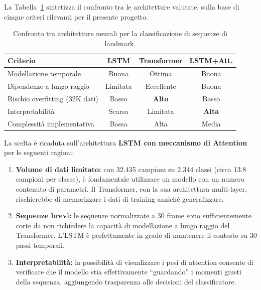 La Tabella~\ref{tab:confronto_architetture} sintetizza il confronto tra le architetture valutate, sulla base di cinque criteri rilevanti per il presente progetto.

\begin{table}[H]
\centering
\begin{tabular}{lccc}
\hline
\textbf{Criterio} & \textbf{LSTM} & \textbf{Transformer} & \textbf{LSTM+Att.} \\
\hline
Modellazione temporale         & Buona    & Ottima     & Buona     \\
Dipendenze a lungo raggio      & Limitata & Eccellente & Buona     \\
Rischio overfitting (32K dati) & Basso    & \textbf{Alto} & Basso     \\
Interpretabilità               & Scarsa   & Limitata   & \textbf{Alta} \\
Complessità implementativa     & Bassa    & Alta       & Media     \\
\hline
\end{tabular}
\caption{Confronto tra architetture neurali per la classificazione di sequenze di landmark.}
\label{tab:confronto_architetture}
\end{table}

La scelta è ricaduta sull'architettura \textbf{LSTM con meccanismo di Attention} per le seguenti ragioni:

\begin{enumerate}
    \item \textbf{Volume di dati limitato:} con 32.435 campioni su 2.344 classi (circa 13.8 campioni per classe), è fondamentale utilizzare un modello con un numero contenuto di parametri. Il Transformer, con la sua architettura multi-layer, rischierebbe di memorizzare i dati di training anziché generalizzare.

    \item \textbf{Sequenze brevi:} le sequenze normalizzate a 30 frame sono sufficientemente corte da non richiedere la capacità di modellazione a lungo raggio del Transformer. L'LSTM è perfettamente in grado di mantenere il contesto su 30 passi temporali.

    \item \textbf{Interpretabilità:} la possibilità di visualizzare i pesi di attention consente di verificare che il modello stia effettivamente ``guardando'' i momenti giusti della sequenza, aggiungendo trasparenza alle decisioni del classificatore.

\end{enumerate}
